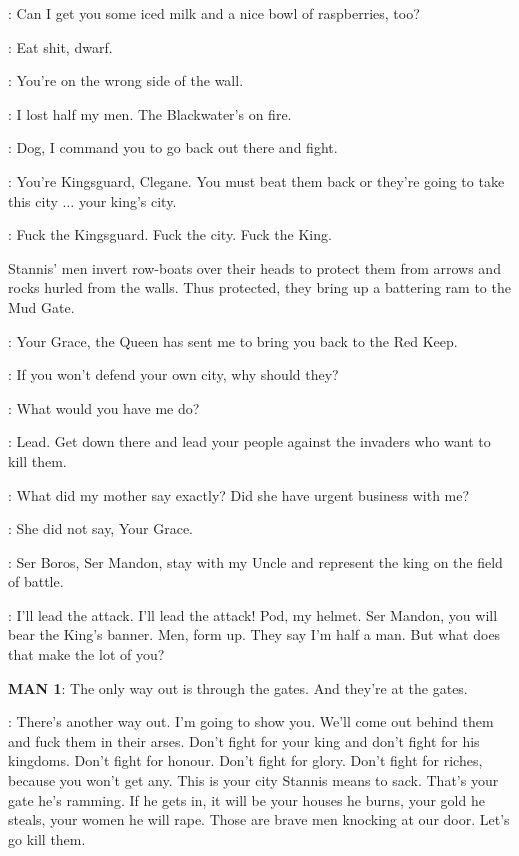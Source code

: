 \TYRION: Can I get you some iced milk and a nice bowl of raspberries, too? 

\HOUND: Eat shit, dwarf. 

\TYRION: You're on the wrong side of the wall. 

\HOUND: I lost half my men. The Blackwater's on fire. 

\JOFFREY:  Dog, I command you to go back out there and fight. 

\TYRION: You're Kingsguard, Clegane. You must beat them back or they're going to take this city $\ldots$ your king's city. 

\HOUND: Fuck the Kingsguard. Fuck the city. Fuck the King. 

\n Stannis' men invert row-boats over their heads to protect them from arrows and rocks hurled from the walls. Thus protected, they bring up a battering ram to the Mud Gate.


\LANCEL: Your Grace, the Queen has sent me to bring you back to the Red Keep. 

\TYRION: If you won't defend your own city, why should they? 

\JOFFREY: What would you have me do? 

\TYRION: Lead. Get down there and lead your people against the invaders who want to kill them. 

\JOFFREY: What did my mother say exactly? Did she have urgent business with me? 

\LANCEL: She did not say, Your Grace. 

\JOFFREY: Ser Boros, Ser Mandon, stay with my Uncle and represent the king on the field of battle. 


\TYRION:  I'll lead the attack.  I'll lead the attack! Pod, my helmet. Ser Mandon, you will bear the King's banner. Men, form up. They say I'm half a man. But what does that make the lot of you? 

\textbf{MAN 1}: The only way out is through the gates. And they're at the gates. 

\TYRION: There's another way out. I'm going to show you. We'll come out behind them and fuck them in their arses.  Don't fight for your king and don't fight for his kingdoms.  Don't fight for honour.  Don't fight for glory.  Don't fight for riches, because you won't get any.  This is your city Stannis means to sack.  That's your gate he's ramming.  If he gets in, it will be your houses he burns, your gold he steals, your women he will rape.  Those are brave men knocking at our door.  Let's go kill them.

